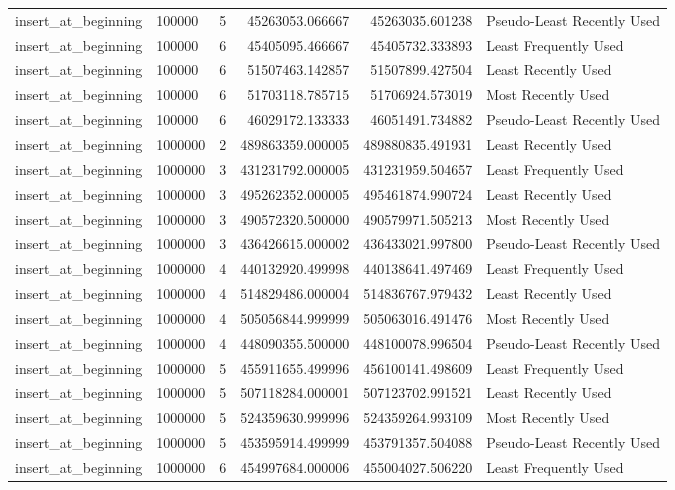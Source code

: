 \begin{tabular}{llrrrl}
insert_at_beginning & 100000 & 5 & 45263053.066667 & 45263035.601238 & Pseudo-Least Recently Used \\
insert_at_beginning & 100000 & 6 & 45405095.466667 & 45405732.333893 & Least Frequently Used \\
insert_at_beginning & 100000 & 6 & 51507463.142857 & 51507899.427504 & Least Recently Used \\
insert_at_beginning & 100000 & 6 & 51703118.785715 & 51706924.573019 & Most Recently Used \\
insert_at_beginning & 100000 & 6 & 46029172.133333 & 46051491.734882 & Pseudo-Least Recently Used \\
insert_at_beginning & 1000000 & 2 & 489863359.000005 & 489880835.491931 & Least Recently Used \\
insert_at_beginning & 1000000 & 3 & 431231792.000005 & 431231959.504657 & Least Frequently Used \\
insert_at_beginning & 1000000 & 3 & 495262352.000005 & 495461874.990724 & Least Recently Used \\
insert_at_beginning & 1000000 & 3 & 490572320.500000 & 490579971.505213 & Most Recently Used \\
insert_at_beginning & 1000000 & 3 & 436426615.000002 & 436433021.997800 & Pseudo-Least Recently Used \\
insert_at_beginning & 1000000 & 4 & 440132920.499998 & 440138641.497469 & Least Frequently Used \\
insert_at_beginning & 1000000 & 4 & 514829486.000004 & 514836767.979432 & Least Recently Used \\
insert_at_beginning & 1000000 & 4 & 505056844.999999 & 505063016.491476 & Most Recently Used \\
insert_at_beginning & 1000000 & 4 & 448090355.500000 & 448100078.996504 & Pseudo-Least Recently Used \\
insert_at_beginning & 1000000 & 5 & 455911655.499996 & 456100141.498609 & Least Frequently Used \\
insert_at_beginning & 1000000 & 5 & 507118284.000001 & 507123702.991521 & Least Recently Used \\
insert_at_beginning & 1000000 & 5 & 524359630.999996 & 524359264.993109 & Most Recently Used \\
insert_at_beginning & 1000000 & 5 & 453595914.499999 & 453791357.504088 & Pseudo-Least Recently Used \\
insert_at_beginning & 1000000 & 6 & 454997684.000006 & 455004027.506220 & Least Frequently Used \\

\end{tabular}
